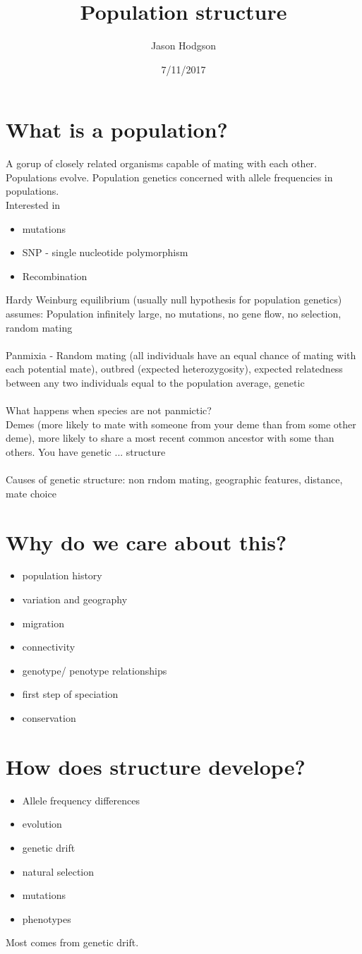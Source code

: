 \documentclass[11pt]{article}
\title{Population structure}
\author{Jason Hodgson}
\date{7/11/2017}
\begin{document}
\maketitle
\section{What is a population?}
A gorup of closely related organisms capable of mating with each other. Populations evolve. Population genetics concerned with allele frequencies in populations.\\
Interested in\\
\begin{itemize}
\item mutations 
\item SNP - single nucleotide 
polymorphism
\item Recombination\\
\end{itemize}
Hardy Weinburg equilibrium (usually null hypothesis for population genetics) assumes: Population infinitely large, no mutations, no gene flow, no selection, random mating \\
\\
Panmixia - Random mating (all individuals have an equal chance of mating with each potential mate), outbred (expected heterozygosity), expected relatedness between any two individuals equal to the population average, genetic
\\
\\
What happens when species are not panmictic? \\
Demes (more likely to mate with someone from your deme than from some other deme), more likely to share a most recent common ancestor with some than others. You have genetic ... structure\\
\\
Causes of genetic structure: non rndom mating, geographic features, distance, mate choice

\section{Why do we care about this?}
\begin{itemize}
\item population history
\item variation and geography
\item migration
\item connectivity
\item genotype/ penotype relationships
\item first step of speciation
\item conservation
\end{itemize}
\section{How does structure develope?}
\begin{itemize}
\item Allele frequency differences
\item evolution
\item genetic drift
\item natural selection
\item mutations
\item phenotypes
\end{itemize}

Most comes from genetic drift.
\end{document}
